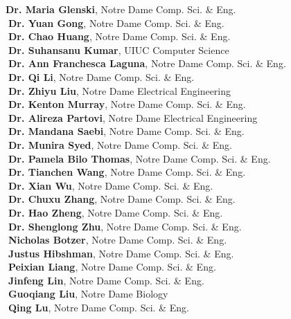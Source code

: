\documentclass[10pt]{article}
\newenvironment{myindentpar}[1]%
{\begin{list}{}%
         {\setlength{\leftmargin}{#1}}%
         \item[]%
}
{\end{list}}
\newcounter{list}
\begin{document}
\begin{myindentpar}{0.75cm}
{\textcolor{white}{} {\bf Dr. Maria Glenski}, Notre Dame Comp. Sci. \& Eng. \\
\textcolor{white}{.}{\bf Dr. Yuan Gong}, Notre Dame Comp. Sci. \& Eng. \\
\textcolor{white}{.}{\bf Dr. Chao Huang}, Notre Dame Comp. Sci. \& Eng. \\
\textcolor{white}{.}{\bf Dr. Suhansanu Kumar}, UIUC Computer Science \\
\textcolor{white}{.}{\bf Dr. Ann Franchesca Laguna}, Notre Dame Comp. Sci. \& Eng. \\
\textcolor{white}{.}{\bf Dr. Qi Li}, Notre Dame Comp. Sci. \& Eng. \\
\textcolor{white}{.}{\bf Dr. Zhiyu Liu}, Notre Dame Electrical Engineering \\
\textcolor{white}{.}{\bf Dr. Kenton Murray}, Notre Dame Comp. Sci. \& Eng. \\
\textcolor{white}{.}{\bf Dr. Alireza Partovi}, Notre Dame Electrical Engineering \\
\textcolor{white}{.}{\bf Dr. Mandana Saebi}, Notre Dame Comp. Sci. \& Eng. \\
\textcolor{white}{.}{\bf Dr. Munira Syed}, Notre Dame Comp. Sci. \& Eng. \\
\textcolor{white}{.}{\bf Dr. Pamela Bilo Thomas}, Notre Dame Comp. Sci. \& Eng. \\
\textcolor{white}{.}{\bf Dr. Tianchen Wang}, Notre Dame Comp. Sci. \& Eng. \\
\textcolor{white}{.}{\bf Dr. Xian Wu}, Notre Dame Comp. Sci. \& Eng. \\
\textcolor{white}{.}{\bf Dr. Chuxu Zhang}, Notre Dame Comp. Sci. \& Eng. \\
\textcolor{white}{.}{\bf Dr. Hao Zheng}, Notre Dame Comp. Sci. \& Eng. \\
\textcolor{white}{.}{\bf Dr. Shenglong Zhu}, Notre Dame Comp. Sci. \& Eng. \\
\textcolor{white}{.}{\bf Nicholas Botzer}, Notre Dame Comp. Sci. \& Eng. \\
\textcolor{white}{.}{\bf Justus Hibshman}, Notre Dame Comp. Sci. \& Eng. \\
\textcolor{white}{.}{\bf Peixian Liang}, Notre Dame Comp. Sci. \& Eng. \\
\textcolor{white}{.}{\bf Jinfeng Lin}, Notre Dame Comp. Sci. \& Eng. \\
\textcolor{white}{.}{\bf Guoqiang Liu}, Notre Dame Biology \\
\textcolor{white}{.}{\bf Qing Lu}, Notre Dame Comp. Sci. \& Eng.
}


\end{myindentpar}
\end{document}
